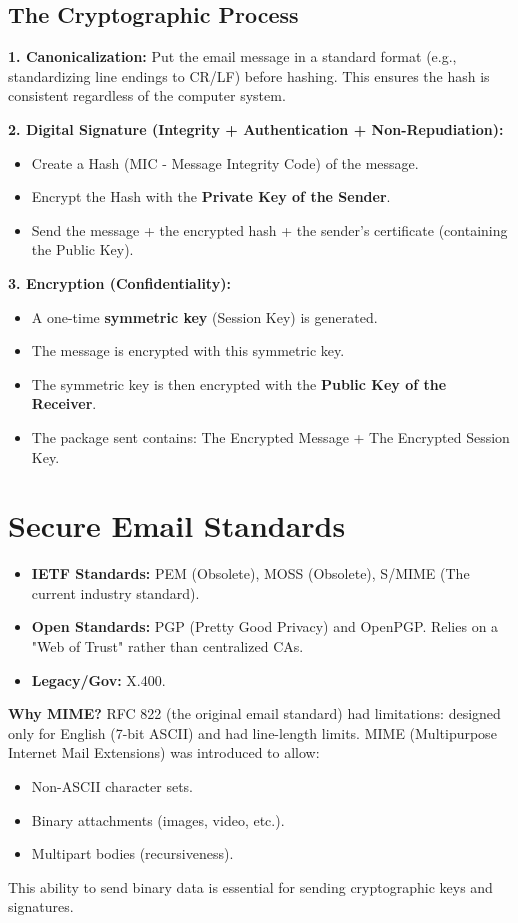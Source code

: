 \subsection{The Cryptographic Process}
\textbf{1. Canonicalization:}
Put the email message in a standard format (e.g., standardizing line endings to CR/LF) before hashing. This ensures the hash is consistent regardless of the computer system.

\textbf{2. Digital Signature (Integrity + Authentication + Non-Repudiation):}
\begin{itemize}
    \item Create a Hash (MIC - Message Integrity Code) of the message.
    \item Encrypt the Hash with the \textbf{Private Key of the Sender}.
    \item Send the message + the encrypted hash + the sender's certificate (containing the Public Key).
\end{itemize}

\textbf{3. Encryption (Confidentiality):}
\begin{itemize}
    \item A one-time \textbf{symmetric key} (Session Key) is generated.
    \item The message is encrypted with this symmetric key.
    \item The symmetric key is then encrypted with the \textbf{Public Key of the Receiver}.
    \item The package sent contains: The Encrypted Message + The Encrypted Session Key.
\end{itemize}

\section{Secure Email Standards}
\begin{itemize}
    \item \textbf{IETF Standards:} PEM (Obsolete), MOSS (Obsolete), S/MIME (The current industry standard).
    \item \textbf{Open Standards:} PGP (Pretty Good Privacy) and OpenPGP. Relies on a "Web of Trust" rather than centralized CAs.
    \item \textbf{Legacy/Gov:} X.400.
\end{itemize}

\textbf{Why MIME?}
RFC 822 (the original email standard) had limitations: designed only for English (7-bit ASCII) and had line-length limits.
MIME (Multipurpose Internet Mail Extensions) was introduced to allow:
\begin{itemize}
    \item Non-ASCII character sets.
    \item Binary attachments (images, video, etc.).
    \item Multipart bodies (recursiveness).
\end{itemize}
This ability to send binary data is essential for sending cryptographic keys and signatures.

